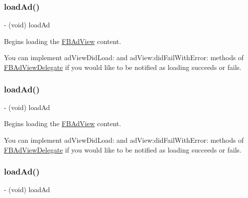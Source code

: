 \subsubsection{\texorpdfstring{load\+Ad()}{loadAd()}\hspace{0.1cm}{\footnotesize\ttfamily [1/5]}}
{\footnotesize\ttfamily -\/ (void) load\+Ad \begin{DoxyParamCaption}{ }\end{DoxyParamCaption}}

Begins loading the \hyperlink{interfaceFBAdView}{F\+B\+Ad\+View} content.

You can implement {\ttfamily ad\+View\+Did\+Load\+:} and {\ttfamily ad\+View\+:did\+Fail\+With\+Error\+:} methods of {\ttfamily \hyperlink{classFBAdViewDelegate-p}{F\+B\+Ad\+View\+Delegate}} if you would like to be notified as loading succeeds or fails. \mbox{\label{interfaceFBAdView_acb5962ac98e3645dd53893d98d5b9564}} 
\subsubsection{\texorpdfstring{load\+Ad()}{loadAd()}\hspace{0.1cm}{\footnotesize\ttfamily [2/5]}}
{\footnotesize\ttfamily -\/ (void) load\+Ad \begin{DoxyParamCaption}{ }\end{DoxyParamCaption}}

Begins loading the \hyperlink{interfaceFBAdView}{F\+B\+Ad\+View} content.

You can implement {\ttfamily ad\+View\+Did\+Load\+:} and {\ttfamily ad\+View\+:did\+Fail\+With\+Error\+:} methods of {\ttfamily \hyperlink{classFBAdViewDelegate-p}{F\+B\+Ad\+View\+Delegate}} if you would like to be notified as loading succeeds or fails. \mbox{\label{interfaceFBAdView_acb5962ac98e3645dd53893d98d5b9564}} 
\subsubsection{\texorpdfstring{load\+Ad()}{loadAd()}\hspace{0.1cm}{\footnotesize\ttfamily [3/5]}}
{\footnotesize\ttfamily -\/ (void) load\+Ad \begin{DoxyParamCaption}{ }\end{DoxyParamCaption}}


